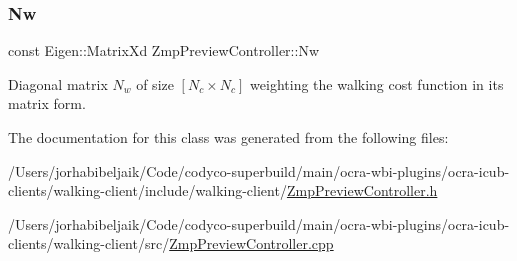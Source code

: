 \subsubsection{\texorpdfstring{Nw}{Nw}}
{\footnotesize\ttfamily const Eigen\+::\+Matrix\+Xd Zmp\+Preview\+Controller\+::\+Nw\hspace{0.3cm}{\ttfamily [private]}}

Diagonal matrix $N_w$ of size $[N_c \times N_c]$ weighting the walking cost function in its matrix form. 

The documentation for this class was generated from the following files\+:\begin{DoxyCompactItemize}
\item 
/\+Users/jorhabibeljaik/\+Code/codyco-\/superbuild/main/ocra-\/wbi-\/plugins/ocra-\/icub-\/clients/walking-\/client/include/walking-\/client/\hyperlink{ZmpPreviewController_8h}{Zmp\+Preview\+Controller.\+h}\item 
/\+Users/jorhabibeljaik/\+Code/codyco-\/superbuild/main/ocra-\/wbi-\/plugins/ocra-\/icub-\/clients/walking-\/client/src/\hyperlink{ZmpPreviewController_8cpp}{Zmp\+Preview\+Controller.\+cpp}\end{DoxyCompactItemize}
